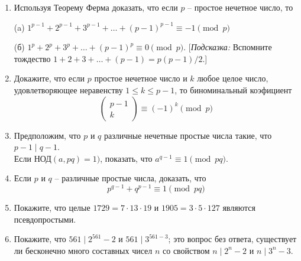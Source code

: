 \documentclass[4apaper,11pt]{article}
\begin{document}
\begin{enumerate}
(а) Если $a^p\equiv b^p\pmod p$, то $a\equiv b\pmod p$.

(б) Если $a^p\equiv b^p\pmod p$, то $a\equiv b\pmod p^2$. [\textsl{Подсказка:} Из пункта (а) $a=b+pk$ для некоторого k, так что $a^p-b^p=(b+pk)^p-b^p$; теперь покажем, что $p^2$ делит последнее выражение]
\item Используя Теорему Ферма доказать, что если $p$ -- простое нечетное число, то

(a) $1^{p-1}+2^{p-1}+3^{p-1}+\dots+(p-1)^{p-1}\equiv -1\pmod p$

(б) $1^p+2^p+3^p+\dots+(p-1)^p\equiv 0 \pmod p$. [\textsl{Подсказка:} Вспомните тождество $1+2+3+\dots+(p-1)=p(p-1)/2$.]
\item Докажите, что если $p$ простое нечетное число и $k$ любое целое число, удовлетворяющее неравенству $1\leq k \leq p-1$, то биноминальный коэфициент \[\begin{pmatrix}
p-1\\k
\end{pmatrix}\equiv (-1)^k\pmod p\]
\item Предположим, что $p$ и $q$ различные нечетные простые числа такие, что $p-1\mid q-1$.\\ Если $\text{НОД}(a,pq)=1)$, показать, что $a^{q-1}\equiv 1\pmod {pq}$.
\item Если $p$ и $q$ -- различные простые числа, доказать, что 
\[p^{q-1}+q^{p-1}\equiv 1\pmod {pq}\]
\item Покажите, что целые $1729=7\cdot13\cdot19$ и $1905=3\cdot5\cdot127$ являются псевдопростыми.
\item Покажите, что $561\mid 2^{561}-2$ и $561\mid 3^{561-3}$; это вопрос без ответа,
существует ли бесконечно много составных чисел $n$ со свойством $n\mid2^n-2$ и $n\mid 3^n-3$.
\end{enumerate}
\end{document}

